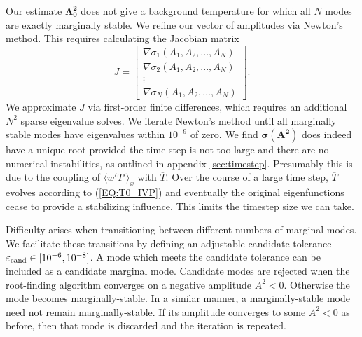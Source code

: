 \documentclass[reprint,amsmath,amssymb,aps,nofootinbib]{revtex4-1}
\renewcommand{\vec}[1]{\boldsymbol{#1}}
\newcommand{\eq}[1]{(\ref{#1})}
\begin{document}
Our estimate $\vec{\Lambda^2_0}$ does not give a background temperature for which all $N$ modes are exactly marginally stable.
We refine our vector of amplitudes via Newton's method.
This requires calculating the Jacobian matrix 
\begin{equation}
    J = \begin{bmatrix}
        \nabla \sigma_1 (A_1, A_2, ..., A_N) \\
        \nabla \sigma_2 (A_1, A_2, ..., A_N) \\
        \vdots \\
        \nabla \sigma_N (A_1, A_2, ..., A_N) 
    \end{bmatrix}.
\end{equation}
We approximate $J$ via first-order finite differences, which requires an additional $N^2$ sparse eigenvalue solves.
We iterate Newton's method until all marginally stable modes have eigenvalues within $10^{-9}$ of zero.
We find $\vec{\sigma}(\vec{A^2})$ does indeed have a unique root provided the time step is not too large and there are no numerical instabilities, as outlined in appendix \ref{sec:timestep}.
Presumably this is due to the coupling of $\langle w'T' \rangle_x$ with $\overline{T}$.
Over the course of a large time step, $\overline{T}$ evolves according to \eq{EQ:T0_IVP} and eventually the original eigenfunctions cease to provide a stabilizing influence.
This limits the timestep size we can take.

Difficulty arises when transitioning between different numbers of marginal modes.
We facilitate these transitions by defining an adjustable candidate tolerance $\varepsilon_{\rm{cand}} \in [10^{-6}, 10^{-8}]$.
A mode which meets the candidate tolerance can be included as a candidate marginal mode.
Candidate modes are rejected when the root-finding algorithm converges on a negative amplitude $A^2 < 0$.
Otherwise the mode becomes marginally-stable.
In a similar manner, a marginally-stable mode need not remain marginally-stable.
If its amplitude converges to some $A^2 < 0$ as before, then that mode is discarded and the iteration is repeated.
\end{document}

